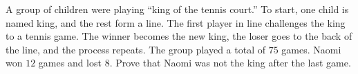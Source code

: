 A group of children were playing “king of the tennis court.” To start, one child is named king, and the rest form a line. The first player in line challenges the king to a tennis game. The winner becomes the new king, the loser goes to the back of the line, and the process repeats. The group played a total of $75$ games. Naomi won $12$ games and lost $8$. Prove that Naomi was not the king after the last game.
